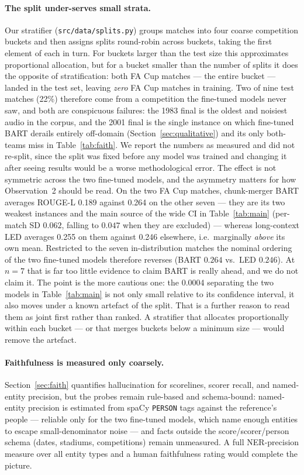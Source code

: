 \documentclass[10pt,a4paper]{article}
\begin{document}
\paragraph{The split under-serves small strata.} Our stratifier (\texttt{src/data/splits.py}) groups matches into four coarse competition buckets and then assigns splits round-robin across buckets, taking the first element of each in turn. For buckets larger than the test size this approximates proportional allocation, but for a bucket smaller than the number of splits it does the opposite of stratification: both FA Cup matches --- the entire bucket --- landed in the test set, leaving \emph{zero} FA Cup matches in training. Two of nine test matches (22\%) therefore come from a competition the fine-tuned models never saw, and both are conspicuous failures: the 1983 final is the oldest and noisiest audio in the corpus, and the 2001 final is the single instance on which fine-tuned BART derails entirely off-domain (Section~\ref{sec:qualitative}) and its only both-teams miss in Table~\ref{tab:faith}. We report the numbers as measured and did not re-split, since the split was fixed before any model was trained and changing it after seeing results would be a worse methodological error. The effect is not symmetric across the two fine-tuned models, and the asymmetry matters for how Observation~2 should be read. On the two FA Cup matches, chunk-merger BART averages ROUGE-L 0.189 against 0.264 on the other seven --- they are its two weakest instances and the main source of the wide CI in Table~\ref{tab:main} (per-match SD $0.062$, falling to $0.047$ when they are excluded) --- whereas long-context LED averages 0.255 on them against 0.246 elsewhere, i.e.\ marginally \emph{above} its own mean. Restricted to the seven in-distribution matches the nominal ordering of the two fine-tuned models therefore reverses (BART $0.264$ vs.\ LED $0.246$). At $n = 7$ that is far too little evidence to claim BART is really ahead, and we do not claim it. The point is the more cautious one: the 0.0004 separating the two models in Table~\ref{tab:main} is not only small relative to its confidence interval, it also moves under a known artefact of the split. That is a further reason to read them as joint first rather than ranked. A stratifier that allocates proportionally within each bucket --- or that merges buckets below a minimum size --- would remove the artefact.

\paragraph{Faithfulness is measured only coarsely.} Section~\ref{sec:faith} quantifies hallucination for scorelines, scorer recall, and named-entity precision, but the probes remain rule-based and schema-bound: named-entity precision is estimated from spaCy \texttt{PERSON} tags against the reference's people --- reliable only for the two fine-tuned models, which name enough entities to escape small-denominator noise --- and facts outside the score/scorer/person schema (dates, stadiums, competitions) remain unmeasured. A full NER-precision measure over all entity types and a human faithfulness rating would complete the picture.
\end{document}
